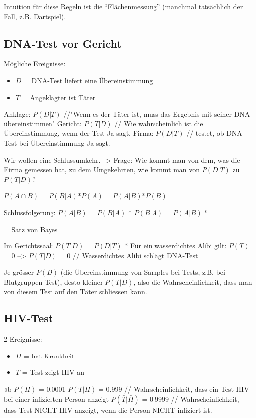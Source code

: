 \documentclass[10pt,a4paper]{scrartcl}
\begin{document}
Intuition für diese Regeln ist die ``Flächenmessung'' (manchmal tatsächlich der Fall, z.B. Dartspiel).


\subsection{DNA-Test vor Gericht}
Mögliche Ereignisse:
\begin{itemize}
\item $D$ = DNA-Test liefert eine Übereinstimmung
\item $T$ = Angeklagter ist Täter
\end{itemize}

Anklage: $P(D|T)$ //"Wenn es der Täter ist, muss das Ergebnis mit seiner DNA übereinstimmen"
Gericht: $P(T|D)$ // Wie wahrscheinlich ist die Übereinstimmung, wenn der Test Ja sagt.
Firma: $P(D|T)$  // testet, ob DNA-Test bei Übereinstimmung Ja sagt.

Wir wollen eine Schlussumkehr. --> Frage: Wie kommt man von dem, was die Firma gemessen hat, zu dem Umgekehrten, wie kommt man von $P(D|T)$ zu $P(T|D)$?

$P(A \cap B)$ = $P(B|A)$*$P(A)$ = $P(A|B)$*$P(B)$

Schlussfolgerung:
$P(A|B)$ = $P(B|A)$ * 
$P(B|A)$ = $P(A|B)$ * 

= Satz von Bayes

Im Gerichtssaal: $P(T|D)$ = $P(D|T)$ * 
Für ein wasserdichtes Alibi gilt: $P(T)$ = 0 --> $P(T|D)$ = 0 // Wasserdichtes Alibi schlägt DNA-Test

Je grösser $P(D)$ (die Übereinstimmung von Samples bei Tests, z.B. bei Blutgruppen-Test), desto kleiner $P(T|D)$, also die Wahrscheinlichkeit, dass man von diesem Test auf den Täter schliessen kann.


\subsection{HIV-Test}
2 Ereignisse:
\begin{itemize}
\item $H$ = hat Krankheit
\item $T$ = Test zeigt HIV an
\end{itemize}
«b
$P(H)$ = 0.0001
$P(T|H)$ = 0.999 // Wahrscheinlichkeit, dass ein Test HIV bei einer infizierten Person anzeigt
$P(\bar{T}|\bar{H})$ = 0.9999 // Wahrscheinlichkeit, dass Test NICHT HIV anzeigt, wenn die Person NICHT infiziert ist.
\end{document}
